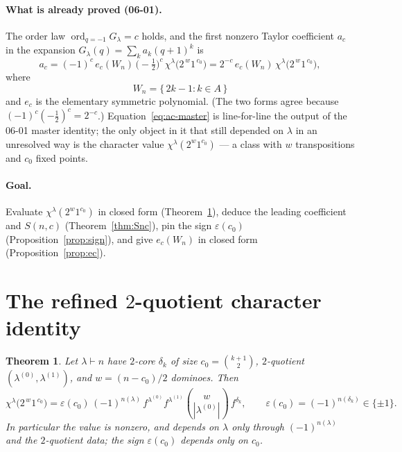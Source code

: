 \documentclass[11pt]{article}
\newtheorem{theorem}{Theorem}
\theoremstyle{definition}
\DeclareMathOperator{\ord}{ord}
\newcommand{\la}{\lambda}
\begin{document}
\paragraph{What is already proved (06-01).}
The order law $\ord_{q=-1}G_\la=c$ holds, and the first nonzero Taylor
coefficient $a_c$ in the expansion $G_\la(q)=\sum_k a_k(q+1)^k$ is
\begin{equation}\label{eq:ac-master}
  a_c=(-1)^{c}\,e_c(W_n)\,\Big(-\tfrac12\Big)^{c}\,\chi^\la\!\big(2^{\,w}1^{\,c_0}\big)
     =2^{-c}\,e_c(W_n)\,\chi^\la\!\big(2^{\,w}1^{\,c_0}\big),
\end{equation}
where
\begin{equation}\label{eq:Wn}
  W_n=\{\,2k-1:k\in A\,\}
\end{equation}
and $e_c$ is the elementary symmetric polynomial. (The two forms agree because
$(-1)^c(-\tfrac12)^c=2^{-c}$.) Equation~\eqref{eq:ac-master} is line-for-line the
output of the 06-01 master identity; the only object in it that still depended on
$\la$ in an unresolved way is the character value $\chi^\la(2^{w}1^{c_0})$ --- a
class with $w$ transpositions and $c_0$ fixed points.

\paragraph{Goal.}
Evaluate $\chi^\la(2^{w}1^{c_0})$ in closed form (Theorem~\ref{thm:char}),
deduce the leading coefficient and $S(n,c)$ (Theorem~\ref{thm:Snc}), pin the sign
$\varepsilon(c_0)$ (Proposition~\ref{prop:sign}), and give $e_c(W_n)$ in closed
form (Proposition~\ref{prop:ec}).

\section{The refined $2$-quotient character identity}\label{sec:char}

\begin{theorem}\label{thm:char}
Let $\la\vdash n$ have $2$-core $\delta_k$ of size $c_0=\binom{k+1}{2}$,
$2$-quotient $(\la^{(0)},\la^{(1)})$, and $w=(n-c_0)/2$ dominoes. Then
\[
  \chi^\la\!\big(2^{\,w}1^{\,c_0}\big)
   =\varepsilon(c_0)\,(-1)^{n(\la)}\,
     f^{\la^{(0)}}f^{\la^{(1)}}\binom{w}{|\la^{(0)}|}\,f^{\delta_k},
   \qquad
   \varepsilon(c_0)=(-1)^{n(\delta_k)}\in\{\pm1\}.
\]
In particular the value is nonzero, and depends on $\la$ only through
$(-1)^{n(\la)}$ and the $2$-quotient data; the sign $\varepsilon(c_0)$ depends
only on $c_0$.
\end{theorem}
\end{document}

